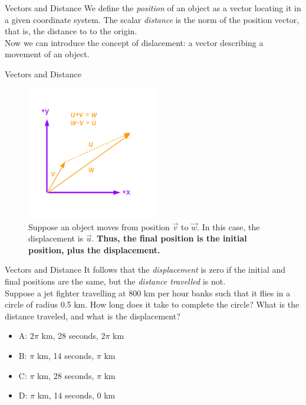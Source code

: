 \documentclass{beamer}
\begin{document}
\begin{frame}{Vectors and Distance}
We define the \textit{position} of an object as a vector locating it in a given coordinate system.  The scalar \textit{distance} is the norm of the position vector, that is, the distance to to the origin. \\
\vspace{0.5cm}
Now we can introduce the concept of \alert{dislacement}: a vector describing a movement of an object.
\end{frame}

\begin{frame}{Vectors and Distance}
\begin{figure}
\centering
\includegraphics[width=0.52\textwidth]{figures/Vectors4.pdf}
\caption{\label{fig:displacement} Suppose an object moves from position $\vec{v}$ to $\vec{w}$.  In this case, the \alert{displacement} is $\vec{u}$. \textbf{Thus, the final position is the initial position, plus the displacement.}}
\end{figure}
\end{frame}

\begin{frame}{Vectors and Distance}
It follows that the \textit{displacement} is zero if the initial and final positions are the same, but the \textit{distance travelled} is not.\\
\vspace{0.2cm}
\small
Suppose a jet fighter travelling at 800 km per hour banks such that it flies in a circle of radius 0.5 km.  How long does it take to complete the circle?  What is the distance traveled, and what is the displacement?
\begin{itemize}
\item A: $2\pi$ km, 28 seconds, $2\pi$ km
\item B: $\pi$ km, 14 seconds, $\pi$ km
\item C: $\pi$ km, 28 seconds, $\pi$ km
\item D: $\pi$ km, 14 seconds, $0$ km
\end{itemize}
\end{frame}
\end{document}
